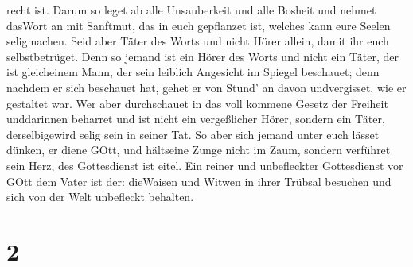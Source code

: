 recht ist.  Darum so leget ab alle Unsauberkeit und alle
Bosheit und nehmet dasWort an mit Sanftmut, das in euch gepflanzet ist,
welches kann eure Seelen seligmachen.  Seid aber Täter des
Worts und nicht Hörer allein, damit ihr euch selbstbetrüget.
 Denn so jemand ist ein Hörer des Worts und nicht ein
Täter, der ist gleicheinem Mann, der sein leiblich Angesicht im Spiegel
beschauet;  denn nachdem er sich beschauet hat, gehet er
von Stund' an davon undvergisset, wie er gestaltet war. 
Wer aber durchschauet in das voll kommene Gesetz der Freiheit
unddarinnen beharret und ist nicht ein vergeßlicher Hörer, sondern ein
Täter, derselbigewird selig sein in seiner Tat.  So aber
sich jemand unter euch lässet dünken, er diene GOtt, und hältseine Zunge
nicht im Zaum, sondern verführet sein Herz, des Gottesdienst ist eitel.
 Ein reiner und unbefleckter Gottesdienst vor GOtt dem
Vater ist der: dieWaisen und Witwen in ihrer Trübsal besuchen und sich
von der Welt unbefleckt behalten.

\hypertarget{section-1}{%
\section{2}\label{section-1}}

